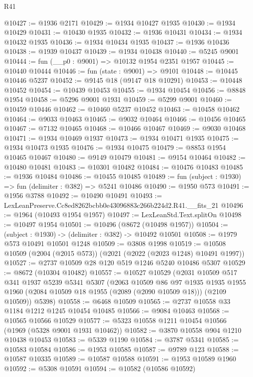 \begin{lexlean}{R41}
\begin{coremodule}
@10427 := @1936 @2171
@10429 := @1934 @10427 @1935
@10430 := @1934 @10429
@10431 := @10430 @1935
@10432 := @1936 @10431
@10434 := @1934 @10432 @1935
@10436 := @1934 @10434 @1935
@10437 := @1936 @10436
@10438 := @1939 @10437
@10439 := @1934 @10438
@10440 := @5245 @9001
@10444 := fun (__p0 : @9001) => @10132 @1954 @2351 @1957
@10445 := @10440 @10444
@10446 := fun (state : @9001) => @9101
@10448 := @10445 @10446 @5237
@10452 := @9145 @18 (@9147 @18 @10291)
@10453 := @10448 @10452
@10454 := @10439 @10453
@10455 := @1934 @10454
@10456 := @8848 @1954
@10458 := @5296 @9001 @1931
@10459 := @5299 @9001
@10460 := @10459 @10446
@10462 := @10460 @5237 @10452
@10463 := @10458 @10462
@10464 := @9033 @10463
@10465 := @9032 @10464
@10466 := @10456 @10465
@10467 := @7132 @10465
@10468 := @10466 @10467
@10469 := @9030 @10468
@10471 := @1934 @10469 @1937
@10473 := @1934 @10471 @1935
@10475 := @1934 @10473 @1935
@10476 := @1934 @10475
@10479 := @8853 @1954 @10465 @10467
@10480 := @9149 @10479
@10481 := @9154 @10464
@10482 := @10480 @10481
@10483 := @10301 @10482
@10484 := @10476 @10483
@10485 := @1936 @10484
@10486 := @10455 @10485
@10489 := fun (subject : @1930) => fun (delimiter : @382) => @5241 @10486
@10490 := @1950 @573
@10491 := @1956 @3788
@10492 := @10490 @10491
@10493 := LexLeanPreserve.Cc8ed8262bcbb0e43096883c266b224d2.R41.__fits_21
@10496 := @1964 (@10493 @1954 @1957)
@10497 := LexLeanStd.Text.splitOn
@10498 := @10497 @1954
@10501 := @10496 (@8672 (@10498 @1957))
@10504 := (subject : @1930) -> (delimiter : @382) -> @10492 @10501
@10508 := @1979 @573 @10491 @10501 @1248
@10509 := @3808 @1998
@10519 := @10508 @10509 (@2004 (@2015 @573)) (@2021 (@2022 (@2023 @1248) @10491 @1997))
@10527 := @2737 @10509 @28 @120 @519 @1246 @5240 @10486 @5307
@10529 := @8672 (@10304 @10482)
@10557 := @10527
    @10529
    (@2031
      @10509
      @517
      @341
      @1937
      @5239
      @5341
      @5307
      (@2063
        @10509
        @86
        @97
        @1935
        @1935
        @1955
        @1960
        (@2084 @10509 @18 @1955 (@2089 (@2090 @10509 @18)))
        (@2109 @10509))
      @5398)
@10558 := @6468 @10509
@10565 := @2737 @10558 @33 @1184 @1212 @1245 @10454 @10485
@10566 := @9084 @10463
@10568 := @10565 @10566 @10529
@10577 := @5323 @10558 @1211 @10454 @10566 (@1969 (@5328 @9001 @1931 @10462))
@10582 := @3870 @10558 @904 @1210 @10438 @10453
@10583 := @5339 @1190
@10584 := @3787 @5341
@10585 := @10583 @10584
@10586 := @1953 @10585
@10587 := @9789 @123
@10588 := @10587 @10335
@10589 := @10587 @10588
@10591 := @1953 @10589 @1960
@10592 := @5308 @10591
@10594 := @10582 (@10586 @10592)

\end{coremodule}
\end{lexlean}
